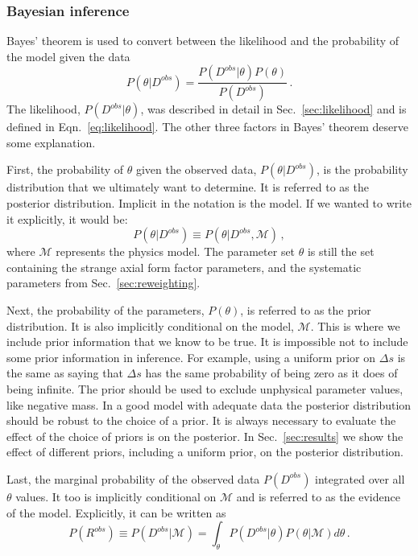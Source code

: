   \subsubsection{Bayesian inference}
    Bayes' theorem is used to convert between the likelihood and the
    probability of the model given the data
    \begin{equation}
      P(\theta|D^{obs}) = \frac{P(D^{obs}|\theta)P(\theta)}{P(D^{obs})} \,.
    \end{equation}
    The likelihood, $P(D^{obs}|\theta)$, was described in detail in
    Sec.~\ref{sec:likelihood} and is defined in Eqn.~\ref{eq:likelihood}. The
    other three factors in Bayes' theorem deserve some explanation.
    
    First, the probability of $\theta$ given the observed data,
    $P(\theta|D^{obs})$, is the probability distribution that we ultimately
    want to determine. It is referred to as the posterior distribution.
    Implicit in the notation is the model. If we wanted to write it explicitly,
    it would be:
    \begin{equation*}
      P(\theta|D^{obs})\equiv P(\theta|D^{obs},\mathcal{M}) \,,
    \end{equation*}
    where $\mathcal{M}$ represents the physics model. The parameter set
    $\theta$ is still the set containing the strange axial form factor
    parameters, and the systematic parameters from Sec.~\ref{sec:reweighting}.

    Next, the probability of the parameters, $P(\theta)$, is referred to as the
    prior distribution. It is also implicitly conditional on the model,
    $\mathcal{M}$. This is where we include prior information that we know to
    be true. It is impossible not to include some prior information in
    inference. For example, using a uniform prior on $\Delta s$ is the same as
    saying that $\Delta s$ has the same probability of being zero as it does of
    being infinite. The prior should be used to exclude unphysical parameter
    values, like negative mass. In a good model with adequate data the
    posterior distribution should be robust to the choice of a prior. It is
    always necessary to evaluate the effect of the choice of priors is on the
    posterior. In Sec.~\ref{sec:results} we show the effect of different
    priors, including a uniform prior, on the posterior distribution.

    Last, the marginal probability of the observed data $P(D^{obs})$ integrated
    over all $\theta$ values.  It too is implicitly conditional on
    $\mathcal{M}$ and is referred to as the evidence of the model. Explicitly,
    it can be written as
    \begin{equation*}
      P(R^{obs}) \equiv P(D^{obs}|\mathcal{M}) 
          = \int_{\theta}P(D^{obs}|\theta)P(\theta|\mathcal{M})d\theta \,.
    \end{equation*}

